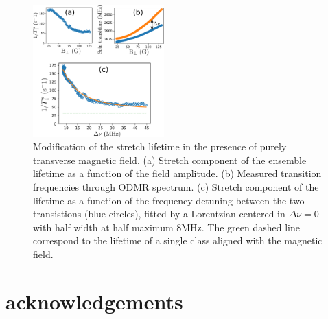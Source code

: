 \documentclass[preprintnumbers,amsmath,amssymb,superscriptaddress,twocolumn,showpacs]{revtex4-1}
\begin{document}
\begin{figure}
\includegraphics[width=0.45\textwidth]{Figures/fig transverse field}
\caption{Modification of the stretch lifetime in the presence of purely transverse magnetic field. (a) Stretch component of the ensemble lifetime as a function of the field amplitude. (b) Measured transition frequencies through ODMR spectrum. (c) Stretch component of the lifetime as a function of the frequency detuning between the two transistions (blue circles), fitted by a Lorentzian centered in $\Delta \nu=0$ with half width at half maximum 8MHz. The green dashed line correspond to the lifetime of a single class aligned with the magnetic field.}
\label{exp_B_transverse}
\end{figure}

\section*{acknowledgements}



\end{document}
